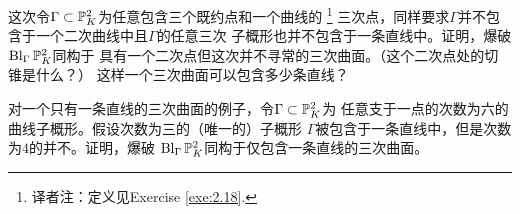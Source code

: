 \begin{exe}\label{exe:4.63}
这次令$\Gamma \subset \P_K^2$为任意包含三个既约点和一个曲线的%
\footnote{
	译者注：定义见Exercise \ref{exe:2.18}.
}%
三次点，同样要求$\Gamma$并不包含于一个二次曲线中且$\Gamma$的任意三次
子概形也并不包含于一条直线中。证明，爆破$\Bl_\Gamma \P_K^2$同构于
具有一个二次点但这次并不寻常的三次曲面。（这个二次点处的切锥是什么？）
这样一个三次曲面可以包含多少条直线？
\end{exe}


\begin{exe}\label{exe:4.64}
对一个只有一条直线的三次曲面的例子，令$\Gamma\subset \P_K^2$为
任意支于一点的次数为六的曲线子概形。假设次数为三的（唯一的）子概形
$\Gamma$被包含于一条直线中，但是次数为$4$的并不。证明，爆破
$\Bl_\Gamma \P_K^2$同构于仅包含一条直线的三次曲面。
\end{exe}